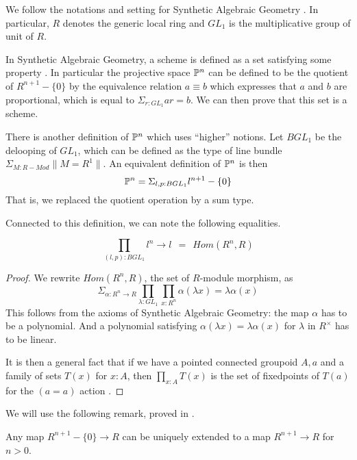 We follow the notations and setting for Synthetic Algebraic Geometry \cite{draft}.
In particular, $R$ denotes the generic
local ring and $GL_1$ is the multiplicative group of unit of $R$.

In Synthetic Algebraic Geometry, a scheme is defined as a set satisfying some property \cite{draft}. In particular
the projective space $\mathbb{P}^n$ can be defined to be the quotient of $R^{n+1}-\{0\}$ by the
equivalence relation $a\equiv b$ which expresses that $a$ and $b$ are proportional, 
which is equal to $\Sigma_{r:GL_1}ar = b$. We can then prove \cite{draft}
that this set is a scheme.

There is another definition of $\mathbb{P}^n$ which uses ``higher'' notions. Let $BGL_1$ be the delooping
of $GL_1$, which can be defined as the type of line bundle $\Sigma_{M:R-Mod}\|{M=R^1}\|$.
An equivalent definition of $\mathbb{P}^n$ is then \cite{Sym}
$$
\mathbb{P}^n = \Sigma_{l,p:BGL_1}l^{n+1}-\{0\}
$$
That is, we replaced the quotient operation by a sum type.

\medskip

Connected to this definition, we can note the following equalities.

\begin{proposition}\label{end}
  $$\prod_{(l,p):BGL_1}l^n\rightarrow l ~~=~~ Hom(R^n,R)$$
\end{proposition}

\begin{proof}
We rewrite $Hom(R^n,R)$, the set of $R$-module morphism, as
$$
\Sigma_{\alpha:R^n\rightarrow R}\prod_{\lambda:GL_1}\prod_{x:R^n}\alpha(\lambda x) = \lambda \alpha(x)
$$
This follows from the axioms of Synthetic Algebraic Geometry: the map $\alpha$ has to be a polynomial. And a polynomial
satisfying $\alpha(\lambda x) = \lambda \alpha(x)$ for $\lambda$ in $R^{\times}$ has to be linear.

\medskip

It is then a general fact that if we have a pointed connected groupoid $A,a$ and a family of
sets $T(x)$ for $x:A$, then $\prod_{x:A}T(x)$ is the set of fixedpoints of $T(a)$ for the $(a=a)$ action
\cite{Sym}.
\end{proof}

We will use the following remark, proved in \cite{draft}.

\begin{lemma}\label{ext}
  Any map $R^{n+1}-\{0\}\rightarrow R$ can be uniquely extended to a map $R^{n+1}\rightarrow R$ for $n>0$.
\end{lemma}

